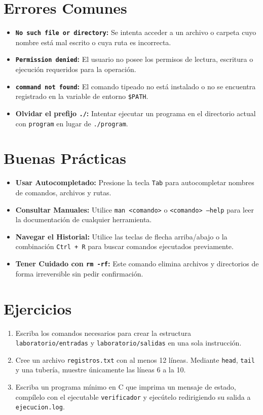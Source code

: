 \documentclass[12pt,a4paper]{article}
\begin{document}
\section{Errores Comunes}
\begin{itemize}
    \item \textbf{\texttt{No such file or directory}:} Se intenta acceder a un archivo o carpeta cuyo nombre está mal escrito o cuya ruta es incorrecta.
    \item \textbf{\texttt{Permission denied}:} El usuario no posee los permisos de lectura, escritura o ejecución requeridos para la operación.
    \item \textbf{\texttt{command not found}:} El comando tipeado no está instalado o no se encuentra registrado en la variable de entorno \texttt{\$PATH}.
    \item \textbf{Olvidar el prefijo \texttt{./}:} Intentar ejecutar un programa en el directorio actual con \texttt{program} en lugar de \texttt{./program}.
\end{itemize}

\section{Buenas Prácticas}
\begin{itemize}
    \item \textbf{Usar Autocompletado:} Presione la tecla \texttt{Tab} para autocompletar nombres de comandos, archivos y rutas.
    \item \textbf{Consultar Manuales:} Utilice \texttt{man <comando>} o \texttt{<comando> --help} para leer la documentación de cualquier herramienta.
    \item \textbf{Navegar el Historial:} Utilice las teclas de flecha arriba/abajo o la combinación \texttt{Ctrl + R} para buscar comandos ejecutados previamente.
    \item \textbf{Tener Cuidado con \texttt{rm -rf}:} Este comando elimina archivos y directorios de forma irreversible sin pedir confirmación.
\end{itemize}

\section{Ejercicios}
\begin{enumerate}
    \item Escriba los comandos necesarios para crear la estructura \texttt{laboratorio/entradas} y \texttt{laboratorio/salidas} en una sola instrucción.
    \item Cree un archivo \texttt{registros.txt} con al menos 12 líneas. Mediante \texttt{head}, \texttt{tail} y una tubería, muestre únicamente las líneas 6 a la 10.
    \item Escriba un programa mínimo en C que imprima un mensaje de estado, compílelo con el ejecutable \texttt{verificador} y ejecútelo redirigiendo su salida a \texttt{ejecucion.log}.
\end{enumerate}
\end{document}
